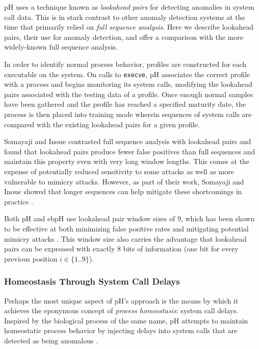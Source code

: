 \documentclass[
  12pt]{findlay}
\begin{document}
\label{ph-lap}

pH uses a technique known as \emph{lookahead pairs}
\autocite{soma02,soma07} for detecting anomalies in system call data.
This is in stark contrast to other anomaly detection systems at the time
that primarily relied on \emph{full sequence analysis}. Here we describe
lookahead pairs, their use for anomaly detection, and offer a comparison
with the more widely-known full sequence analysis.

In order to identify normal process behavior, profiles are constructed
for each executable on the system. On calls to
\passthrough{\lstinline!execve!}, pH associates the correct profile with
a process and begins monitoring its system calls, modifying the
lookahead pairs associated with the testing data of a profile. Once
enough normal samples have been gathered and the profile has reached a
specified maturity date, the process is then placed into training mode
wherein sequences of system calls are compared with the existing
lookahead pairs for a given profile.

Somayaji and Inoue \autocite{soma07} contrasted full sequence analysis
with lookahead pairs and found that lookahead pairs produce fewer false
positives than full sequences and maintain this property even with very
long window lengths. This comes at the expense of potentially reduced
sensitivity to some attacks as well as more vulnerable to mimicry
attacks. However, as part of their work, Somayaji and Inoue showed that
longer sequences can help mitigate these shortcomings in practice
\autocite{soma07}.

Both pH and ebpH use lookahead pair window sizes of 9, which has been
shown to be effective at both minimizing false positive rates and
mitigating potential mimicry attacks \autocite{soma02}. This window size
also carries the advantage that lookahead pairs can be expressed with
exactly 8 bits of information (one bit for every previous position
\(i \in \{1..9\}\)).

\hypertarget{homeostasis-through-system-call-delays}{%
\subsubsection{Homeostasis Through System Call
Delays}\label{homeostasis-through-system-call-delays}}

Perhaps the most unique aspect of pH's approach is the means by which it
achieves the eponymous concept of \emph{process homeostasis}: system
call delays. Inspired by the biological process of the same name, pH
attempts to maintain homeostatic process behavior by injecting delays
into system calls that are detected as being anomalous
\autocite{soma02}.
\end{document}
